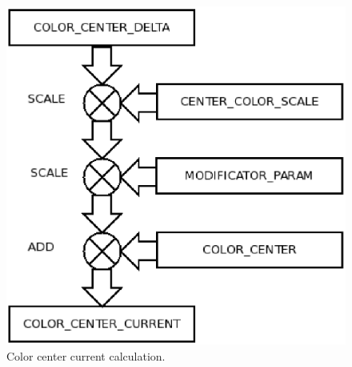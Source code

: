 \documentclass[9pt]{article}
\begin{document}
\begin{figure}[h]
\begin{center}
  \includegraphics[scale=0.6]{p10.eps}
  \caption{Color center current calculation.}
  \label{color_center_current_calculation}
\end{center}
\end{figure}

\clearpage
\end{document}
